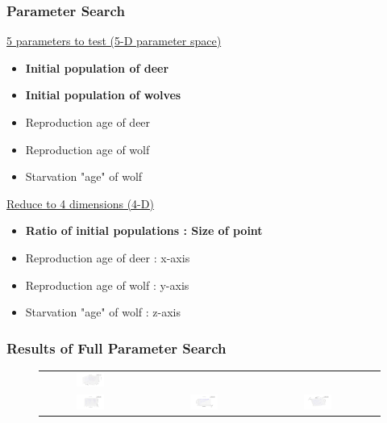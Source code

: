 \documentclass{beamer}
\begin{document}
\frame
{
  \frametitle{Parameter Search}
  \underline{5 parameters to test (5-D parameter space)}
  \begin{itemize}
  \item{\textbf{Initial population of deer}}
  \item{\textbf{Initial population of wolves}}
  \item{Reproduction age of deer}
  \item{Reproduction age of wolf}
  \item{Starvation "age" of wolf}
  \end{itemize} 

  \underline{Reduce to 4 dimensions (4-D)}
  \begin{itemize}
  \item{\textbf{Ratio of initial populations : Size of point}}
  \item{Reproduction age of deer : x-axis}
  \item{Reproduction age of wolf : y-axis}
  \item{Starvation "age" of wolf : z-axis}
  \end{itemize} 

}
\frame
{
  \frametitle{Results of Full Parameter Search}
  \begin{figure}[H]
  \centering
        \begin{tabular}{@{}cc@{}cc@{}cc@{}}
                \includegraphics[width = 0.3\textwidth]{./pics/Eco_All_param_front.png} \\
                \includegraphics[width = 0.3\textwidth]{./pics/Eco_All_param_rep_v_rep.png} &&
                \includegraphics[width = 0.3\textwidth]{./pics/Eco_All_param_wage_v_wstarve.png} &&
                \includegraphics[width = 0.3\textwidth]{./pics/Eco_All_param_wstarve_v_drep.png} \\
        \end{tabular}
        \label{RestrictParam}
  \end{figure}

}
\end{document}
